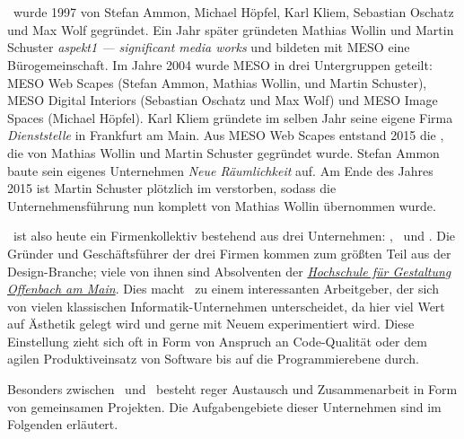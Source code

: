 \section{\meso}
\label{sec:e_meso}

\meso~wurde 1997 von Stefan Ammon, Michael Höpfel, Karl Kliem, Sebastian
Oschatz und Max Wolf gegründet. Ein Jahr später gründeten Mathias Wollin und
Martin Schuster \emph{aspekt1 --- significant media works} und bildeten mit
MESO eine Bürogemeinschaft.  Im Jahre 2004 wurde MESO in drei Untergruppen
geteilt: MESO Web Scapes (Stefan Ammon, Mathias Wollin, und Martin Schuster),
MESO Digital Interiors (Sebastian Oschatz und Max Wolf) und MESO Image Spaces
(Michael Höpfel). Karl Kliem gründete im selben Jahr seine eigene Firma
\emph{Dienststelle} in Frankfurt am Main.  Aus MESO Web Scapes entstand 2015
die \mesods, die von Mathias Wollin und Martin Schuster gegründet wurde.
Stefan Ammon baute sein eigenes Unternehmen \emph{Neue Räumlichkeit} auf.  Am
Ende des Jahres 2015 ist Martin Schuster plötzlich im verstorben, sodass die
Unternehmensführung nun komplett von Mathias Wollin übernommen wurde.

\meso~ist also heute ein Firmenkollektiv bestehend aus drei Unternehmen:
\mesodi, \mesods~und \mesois.  Die Gründer und Geschäftsführer der drei Firmen
kommen zum größten Teil aus der Design-Branche; viele von ihnen sind Absolventen
der \emph{\href{http://hfg-offenbach.de}{Hochschule für Gestaltung Offenbach am
Main}}.  Dies macht \meso~zu einem interessanten Arbeitgeber, der sich von
vielen klassischen Informatik-Unternehmen unterscheidet, da hier viel Wert auf
Ästhetik gelegt wird und gerne mit Neuem experimentiert wird.  Diese Einstellung
zieht sich oft in Form von Anspruch an Code-Qualität oder dem agilen
Produktiveinsatz von Software bis auf die Programmierebene durch.

Besonders zwischen \mesodi~und \mesods~besteht reger Austausch und
Zusammenarbeit in Form von gemeinsamen Projekten.  Die Aufgabengebiete dieser
Unternehmen sind im Folgenden erläutert.



